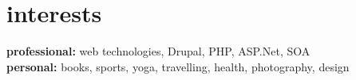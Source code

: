 \documentclass[]{friggeri-cv} %
\begin{document}

\section{interests}

\textbf{professional:} web technologies, Drupal, PHP, ASP.Net, SOA \\
\textbf{personal:} books, sports, yoga, travelling, health, photography, design

\end{document}
